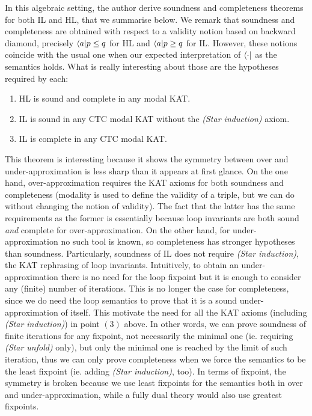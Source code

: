 In this algebraic setting, the author derive soundness and completeness theorems for both IL and HL, that we summarise below. We remark that soundness and completeness are obtained with respect to a validity notion based on backward diamond, precisely $\langle a \vert p \le q$ for HL and $\langle a \vert p \ge q$ for IL. However, these notions coincide with the usual one when our expected interpretation of $\langle \cdot \vert$ as the semantics holds.
What is really interesting about those are the hypotheses required by each:
\begin{theorem}
	\leavevmode
	\begin{enumerate}
		\item HL is sound and complete in any modal KAT.
		\item IL is sound in any CTC modal KAT without the \textit{(Star induction)} axiom.
		\item IL is complete in any CTC modal KAT.
	\end{enumerate}
\end{theorem}
This theorem is interesting because it shows the symmetry between over and under-approximation is less sharp than it appears at first glance.
On the one hand, over-approximation requires the KAT axioms for both soundness and completeness (modality is used to define the validity of a triple, but we can do without changing the notion of validity). The fact that the latter has the same requirements as the former is essentially because loop invariants are both sound \emph{and} complete for over-approximation.
On the other hand, for under-approximation no such tool is known, so completeness has stronger hypotheses than soundness. Particularly, soundness of IL does not require \textit{(Star induction)}, the KAT rephrasing of loop invariants. Intuitively, to obtain an under-approximation there is no need for the loop fixpoint but it is enough to consider any (finite) number of iterations. This is no longer the case for completeness, since we do need the loop semantics to prove that it is a sound under-approximation of itself. This motivate the need for all the KAT axioms (including \textit{(Star induction)}) in point $(3)$ above. In other words, we can prove soundness of finite iterations for any fixpoint, not necessarily the minimal one (ie. requiring \textit{(Star unfold)} only), but only the minimal one is reached by the limit of such iteration, thus we can only prove completeness when we force the semantics to be the least fixpoint (ie. adding \textit{(Star induction)}, too).
In terms of fixpoint, the symmetry is broken because we use least fixpoints for the semantics both in over and under-approximation, while a fully dual theory would also use greatest fixpoints.

